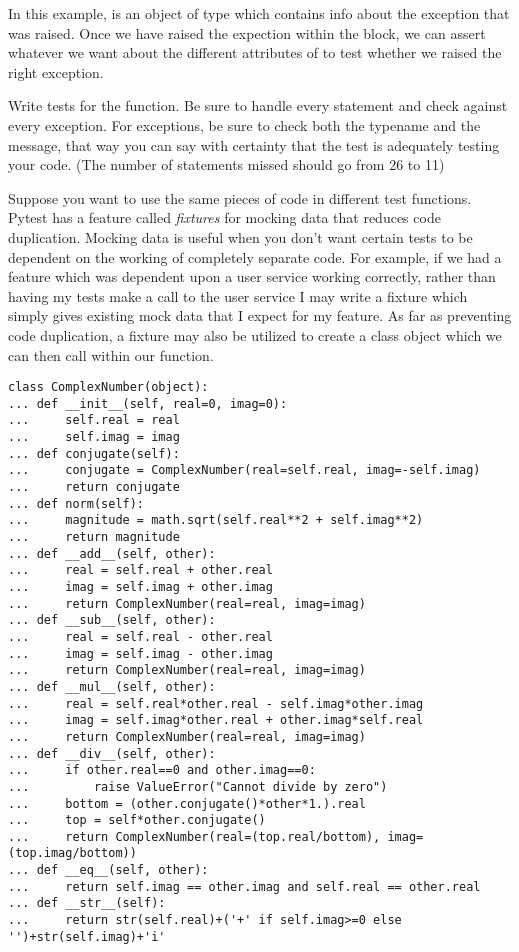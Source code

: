 In this example,  is an object of type  which contains info about the exception that was raised.  Once we have raised the expection within the  block, we can assert whatever we want about the different attributes of  to test whether we raised the right exception.

\begin{problem}
Write tests for the  function.
Be sure to handle every statement and check against every exception.
For exceptions, be sure to check both the typename and the message, that way you can say with certainty that the test is adequately testing your code.
(The number of statements missed should go from 26 to 11)
\end{problem}

Suppose you want to use the same pieces of code in different test functions. Pytest has a feature called \emph{fixtures} for mocking data that reduces code duplication.
Mocking data is useful when you don't want certain tests to be dependent on the working of completely separate code.
For example, if we had a feature which was dependent upon a user service working correctly, rather than having my tests make a call to the user service I may write a fixture which simply gives existing mock data that I expect for my feature.
As far as preventing code duplication, a fixture may also be utilized to create a class object which we can then call within our function.

\begin{lstlisting}
class ComplexNumber(object):
... def __init__(self, real=0, imag=0):
...     self.real = real
...     self.imag = imag
... def conjugate(self):
...     conjugate = ComplexNumber(real=self.real, imag=-self.imag)
...     return conjugate
... def norm(self):
...     magnitude = math.sqrt(self.real**2 + self.imag**2)
...     return magnitude
... def __add__(self, other):
...     real = self.real + other.real
...     imag = self.imag + other.imag
...     return ComplexNumber(real=real, imag=imag)
... def __sub__(self, other):
...     real = self.real - other.real
...     imag = self.imag - other.imag
...     return ComplexNumber(real=real, imag=imag)
... def __mul__(self, other):
...     real = self.real*other.real - self.imag*other.imag
...     imag = self.imag*other.real + other.imag*self.real
...     return ComplexNumber(real=real, imag=imag)
... def __div__(self, other):
...     if other.real==0 and other.imag==0:
...         raise ValueError("Cannot divide by zero")
...     bottom = (other.conjugate()*other*1.).real
...     top = self*other.conjugate()
...     return ComplexNumber(real=(top.real/bottom), imag=(top.imag/bottom))
... def __eq__(self, other):
...     return self.imag == other.imag and self.real == other.real
... def __str__(self):
...     return str(self.real)+('+' if self.imag>=0 else '')+str(self.imag)+'i'
\end{lstlisting}

